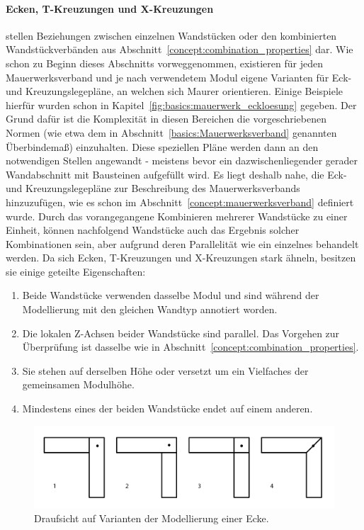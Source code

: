 \paragraph*{Ecken, T-Kreuzungen und X-Kreuzungen}\label{concept:corner_etc_properties} stellen Beziehungen zwischen einzelnen Wandstücken oder den kombinierten Wandstückverbänden aus Abschnitt~\ref{concept:combination_properties} dar.
Wie schon zu Beginn dieses Abschnitts vorweggenommen, existieren für jeden Mauerwerksverband und je nach verwendetem Modul eigene Varianten für Eck- und Kreuzungslegepläne, an welchen sich Maurer orientieren.
Einige Beispiele hierfür wurden schon in Kapitel~\ref{fig:basics:mauerwerk_eckloesung} gegeben.
Der Grund dafür ist die Komplexität in diesen Bereichen die vorgeschriebenen Normen (wie etwa dem in Abschnitt~\ref{basics:Mauerwerksverband} genannten Überbindemaß) einzuhalten.
Diese speziellen Pläne werden dann an den notwendigen Stellen angewandt - meistens bevor ein dazwischenliegender gerader Wandabschnitt mit Bausteinen aufgefüllt wird.
Es liegt deshalb nahe, die Eck- und Kreuzungslegepläne zur Beschreibung des Mauerwerksverbands hinzuzufügen, wie es schon im Abschnitt~\ref{concept:mauerwerksverband} definiert wurde.
Durch das vorangegangene Kombinieren mehrerer Wandstücke zu einer Einheit, können nachfolgend Wandstücke auch das Ergebnis solcher Kombinationen sein, aber aufgrund deren Parallelität wie ein einzelnes behandelt werden.
Da sich Ecken, T-Kreuzungen und X-Kreuzungen stark ähneln, besitzen sie einige geteilte Eigenschaften:
\begin{enumerate}
    \item\label{concept:tmp1} Beide Wandstücke verwenden dasselbe Modul und sind während der Modellierung mit den gleichen Wandtyp annotiert worden.
    \item Die lokalen Z-Achsen beider Wandstücke sind parallel. Das Vorgehen zur Überprüfung ist dasselbe wie in Abschnitt~\ref{concept:combination_properties}.
    \item Sie stehen auf derselben Höhe oder versetzt um ein Vielfaches der gemeinsamen Modulhöhe.
    \item\label{concept:tmp4} Mindestens eines der beiden Wandstücke endet auf einem anderen.
\end{enumerate}

\begin{figure}[ht]
    \centering
    \includegraphics[width=0.8\columnwidth]{fig/ecken_variationen.png}
    \caption{Draufsicht auf Varianten der Modellierung einer Ecke.}\label{fig:concept:ecken_variationen}
\end{figure}


